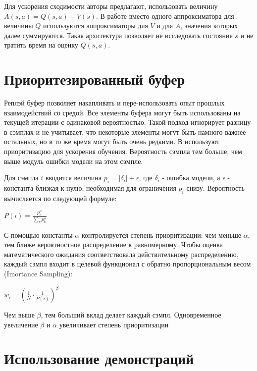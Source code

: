 \documentclass{mipt-thesis-bs}
\begin{document}
Для ускорения сходимости авторы \cite{dueling dqn} предлагают, использовать величину $A(s,a)=Q(s,a) - V(s)$. В работе вместо одного аппроксиматора для величины $Q$ используются аппроксиматоры для $V$ и для $A$, значения которых далее суммируются. Такая архитектура позволяет не исследовать состояние $s$ и не тратить время на оценку $Q(s,a)$.

\section{Приоритезированный буфер}

Реплэй буфер позволяет накапливать и пере-использовать опыт прошлых взаимодействий со средой. Все элементы буфера могут быть использованы на текущей итерации с одинаковой вероятностью. Такой подход игнорирует разницу в сэмплах и не учитывает, что некоторые элементы могут быть намного важнее остальных, но в то же время могут быть очень редкими. В \cite{per} используют приоритизацию для ускорения обучения. Вероятность сэмпла тем больше, чем выше модуль ошибки модели на этом сэмпле.

Для сэмпла $i$ вводится величина $p_i=|\delta_i| + \epsilon$, где $\delta_i$ - ошибка модели, а $\epsilon$ - константа близкая к нулю, необходимая для ограничения $p_i$ снизу. Вероятность вычисляется по следующей формуле:

\begin{center}
    $P(i)=\frac{p_{i}^{\alpha}}{\sum_{k} p_{k}^{\alpha}}$
\end{center}

С помощью константы $\alpha$ контролируется степень приоритизации: чем меньше $\alpha$, тем ближе вероятностное распределение к равномерному. Чтобы оценка математического ожидания соответствовала действительному распределению, каждый сэмпл входит в целевой функционал с обратно пропорциональным весом (Imortance Sampling):

\begin{center}
$w_{i}=\left(\frac{1}{N} \cdot \frac{1}{P(i)}\right)^{\beta}$    
\end{center}

Чем выше $\beta$, тем больший вклад делает каждый сэмпл. Одновременное увеличение $\beta$ и $\alpha$ увеличивает степень приоритизации

\section{Использование демонстраций}
\end{document}
